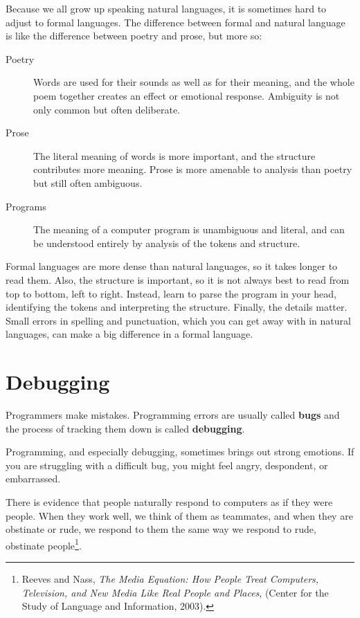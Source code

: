Because we all grow up speaking natural languages, it is sometimes
hard to adjust to formal languages.  The difference between formal and
natural language is like the difference between poetry and prose, but
more so:  

\begin{description}

\item[Poetry] Words are used for their sounds as well as for
their meaning, and the whole poem together creates an effect or
emotional response.  Ambiguity is not only common but often
deliberate.

\item[Prose] The literal meaning of words is more important,
and the structure contributes more meaning.  Prose is more amenable to
analysis than poetry but still often ambiguous.

\item[Programs] The meaning of a computer program is unambiguous
and literal, and can be understood entirely by analysis of the
tokens and structure.

\end{description}

Formal languages are more dense
than natural languages, so it takes longer to read them.  Also, the
structure is important, so it is not always best to read
from top to bottom, left to right.  Instead, learn to parse the
program in your head, identifying the tokens and interpreting the
structure.  Finally, the details matter.  Small errors in
spelling and punctuation, which you can get away
with in natural languages, can make a big difference in a formal
language.


\section{Debugging}

Programmers make mistakes.  Programming errors are usually 
called {\bf bugs} and the process of tracking them down is called
{\bf debugging}.

Programming, and especially debugging, sometimes brings out strong
emotions.  If you are struggling with a difficult bug, you might 
feel angry, despondent, or embarrassed.

There is evidence that people naturally respond to computers as if
they were people.  When they work well, we think
of them as teammates, and when they are obstinate or rude, we
respond to them the same way we respond to rude,
obstinate people\footnote{Reeves and Nass, {\it The Media
    Equation: How People Treat Computers, Television, and New Media
    Like Real People and Places}, (Center for the Study of Language and Information, 2003).}.

